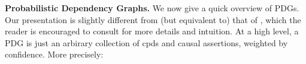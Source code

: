 \documentclass[twoside]{article}
\begin{document}
\textbf{Probabilistic Dependency Graphs.}
We now give a quick overview of PDGs. Our presentation is slightly
different from (but equivalent to) that of
\textcite{pdg-aaai}, which
the reader is encouraged to consult for more details and intuition.
At a high level, a PDG
is just an arbirary collection of cpds and causal assertions,
    weighted by confidence. More precisely:
\end{document}
